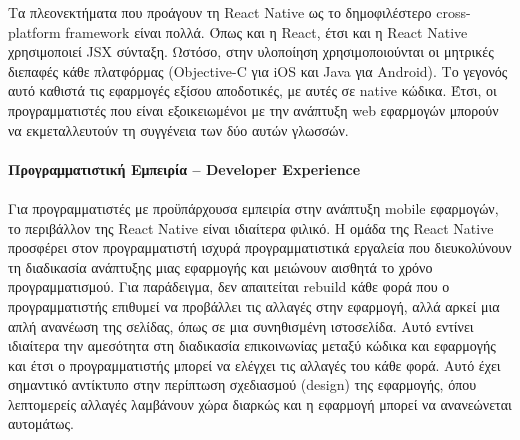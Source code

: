 Τα πλεονεκτήματα που προάγουν τη React Native ως το δημοφιλέστερο cross-platform framework είναι πολλά. Όπως και η React, έτσι και η React Native χρησιμοποιεί JSX σύνταξη. Ωστόσο, στην υλοποίηση χρησιμοποιούνται οι μητρικές διεπαφές κάθε πλατφόρμας (Objective-C για iOS και Java για Android). Το γεγονός αυτό καθιστά τις εφαρμογές εξίσου αποδοτικές, με αυτές σε native κώδικα. Έτσι, οι προγραμματιστές που είναι εξοικειωμένοι με την ανάπτυξη web εφαρμογών μπορούν να εκμεταλλευτούν τη συγγένεια των δύο αυτών γλωσσών.

\paragraph{Προγραμματιστική Εμπειρία \textbf{--} Developer Experience} 
\paragraph{}
Για προγραμματιστές με προϋπάρχουσα εμπειρία στην ανάπτυξη mobile εφαρμογών, το περιβάλλον της React Native είναι ιδιαίτερα φιλικό. Η ομάδα της React Native προσφέρει στον προγραμματιστή ισχυρά προγραμματιστικά εργαλεία που διευκολύνουν τη διαδικασία ανάπτυξης μιας εφαρμογής και μειώνουν αισθητά το χρόνο προγραμματισμού. Για παράδειγμα, δεν απαιτείται rebuild κάθε φορά που ο προγραμματιστής επιθυμεί να προβάλλει τις αλλαγές στην εφαρμογή, αλλά αρκεί μια απλή ανανέωση της σελίδας, όπως σε μια συνηθισμένη ιστοσελίδα. Αυτό εντίνει ιδιαίτερα την αμεσότητα στη διαδικασία επικοινωνίας μεταξύ κώδικα και εφαρμογής και έτσι ο προγραμματιστής μπορεί να ελέγχει τις αλλαγές του κάθε φορά. Αυτό έχει σημαντικό αντίκτυπο στην περίπτωση σχεδιασμού (design) της εφαρμογής, όπου λεπτομερείς αλλαγές λαμβάνουν χώρα διαρκώς και η εφαρμογή μπορεί να ανανεώνεται αυτομάτως.    

